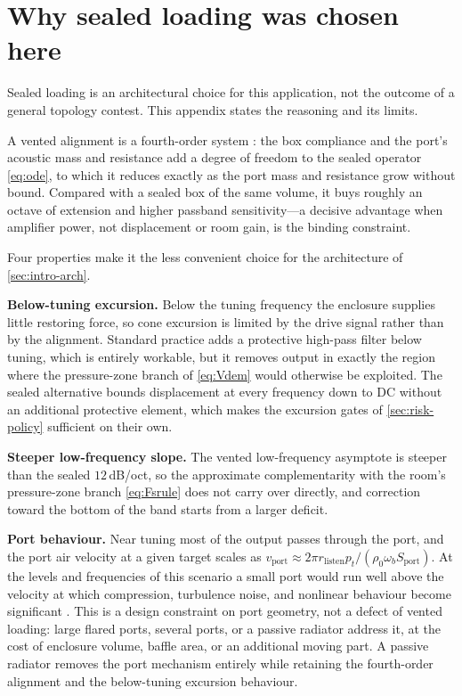 \section{Why sealed loading was chosen here}
\label{app:vented}

Sealed loading is an architectural choice for this application, not the
outcome of a general topology contest. This appendix states the reasoning
and its limits.

A vented alignment is a fourth-order system \cite{small1973vented}: the box
compliance and the port's acoustic mass and resistance add a degree of
freedom to the sealed operator \cref{eq:ode}, to which it reduces exactly
as the port mass and resistance grow without bound. Compared with a sealed
box of the same volume, it buys roughly an octave of extension and higher
passband sensitivity---a decisive advantage when amplifier power, not
displacement or room gain, is the binding constraint.

Four properties make it the less convenient choice for the architecture of
\cref{sec:intro-arch}.

\textbf{Below-tuning excursion.} Below the tuning frequency the enclosure
supplies little restoring force, so cone excursion is limited by the drive
signal rather than by the alignment. Standard practice adds a protective
high-pass filter below tuning, which is entirely workable, but it removes
output in exactly the region where the pressure-zone branch of
\cref{eq:Vdem} would otherwise be exploited. The sealed alternative bounds
displacement at every frequency down to DC without an additional protective
element, which makes the excursion gates of \cref{sec:risk-policy}
sufficient on their own.

\textbf{Steeper low-frequency slope.} The vented low-frequency asymptote is
steeper than the sealed $12$\,dB/oct, so the approximate complementarity
with the room's pressure-zone branch \cref{eq:Fsrule} does not carry over
directly, and correction toward the bottom of the band starts from a larger
deficit.

\textbf{Port behaviour.} Near tuning most of the output passes through the
port, and the port air velocity at a given target scales as
$v_{\mathrm{port}}\approx2\pi r_{\mathrm{listen}}p_t/
(\rho_0\omega_b S_{\mathrm{port}})$. At the levels and frequencies of this
scenario a small port would run well above the velocity at which
compression, turbulence noise, and nonlinear behaviour become significant
\cite{salvatti2002,vanderkooy1998}. This is a design constraint on port
geometry, not a defect of vented loading: large flared ports, several
ports, or a passive radiator address it, at the cost of enclosure volume,
baffle area, or an additional moving part. A passive radiator removes the
port mechanism entirely while retaining the fourth-order alignment and the
below-tuning excursion behaviour.

